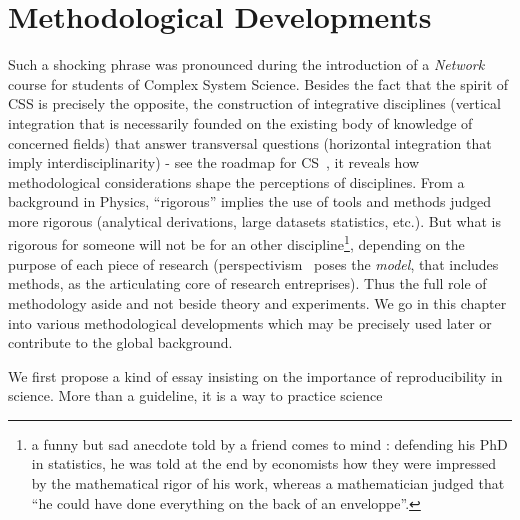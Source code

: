 



\chapter{Methodological Developments} %

\label{ch:methodology} %




Such a shocking phrase was pronounced during the introduction of a \emph{Network} course for students of Complex System Science. Besides the fact that the spirit of CSS is precisely the opposite, \ie the construction of integrative disciplines (vertical integration that is necessarily founded on the existing body of knowledge of concerned fields) that answer transversal questions (horizontal integration that imply interdisciplinarity) - see \eg the roadmap for CS~\cite{2009arXiv0907.2221B}, it reveals how methodological considerations shape the perceptions of disciplines. From a background in Physics, ``rigorous'' implies the use of tools and methods judged more rigorous (analytical derivations, large datasets statistics, etc.). But what is rigorous for someone will not be for an other discipline\footnote{a funny but sad anecdote told by a friend comes to mind : defending his PhD in statistics, he was told at the end by economists how they were impressed by the mathematical rigor of his work, whereas a mathematician judged that ``he could have done everything on the back of an enveloppe''.}, depending on the purpose of each piece of research (perspectivism~\cite{giere2010scientific} poses the \emph{model}, that includes methods, as the articulating core of research entreprises). Thus the full role of methodology aside and not beside theory and experiments. We go in this chapter into various methodological developments which may be precisely used later or contribute to the global background.

We first propose a kind of essay insisting on the importance of reproducibility in science. More than a guideline, it is a way to practice science





